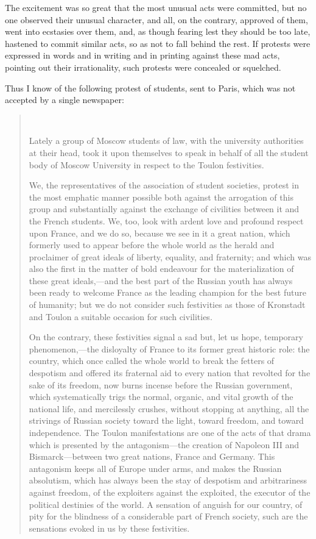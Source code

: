 \documentclass{book}
\begin{document}
The excitement was so great that the most unusual acts were committed, but no one observed their unusual character, and all, on the contrary, approved of them, went into ecstasies over them, and, as though fearing lest they should be too late, hastened to commit similar acts, so as not to fall behind the rest. If protests were expressed in words and in writing and in printing against these mad acts, pointing out their irrationality, such protests were concealed or squelched.

Thus I know of the following protest of students, sent to Paris, which was not accepted by a single newspaper:

\begin{quotation}\

	Lately a group of Moscow students of law, with the university authorities at their head, took it upon themselves to speak in behalf of all the student body of Moscow University in respect to the Toulon festivities.

	We, the representatives of the association of student societies, protest in the most emphatic manner possible both against the arrogation of this group and substantially against the exchange of civilities between it and the French students. We, too, look with ardent love and profound respect upon France, and we do so, because we see in it a great nation, which formerly used to appear before the whole world as the herald and proclaimer of great ideals of liberty, equality, and fraternity; and which was also the first in the matter of bold endeavour for the materialization of these great ideals,—and the best part of the Russian youth has always been ready to welcome France as the leading champion for the best future of humanity; but we do not consider such festivities as those of Kronstadt and Toulon a suitable occasion for such civilities.

	On the contrary, these festivities signal a sad but, let us hope, temporary phenomenon,—the disloyalty of France to its former great historic role: the country, which once called the whole world to break the fetters of despotism and offered its fraternal aid to every nation that revolted for the sake of its freedom, now burns incense before the Russian government, which systematically trigs the normal, organic, and vital growth of the national life, and mercilessly crushes, without stopping at anything, all the strivings of Russian society toward the light, toward freedom, and toward independence. The Toulon manifestations are one of the acts of that drama which is presented by the antagonism—the creation of Napoleon III and Bismarck—between two great nations, France and Germany. This antagonism keeps all of Europe under arms, and makes the Russian absolutism, which has always been the stay of despotism and arbitrariness against freedom, of the exploiters against the exploited, the executor of the political destinies of the world. A sensation of anguish for our country, of pity for the blindness of a considerable part of French society, such are the sensations evoked in us by these festivities.


\end{quotation}
\end{document}
